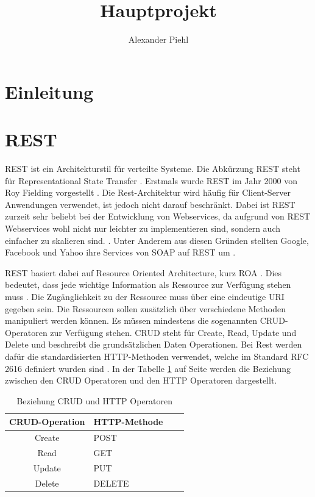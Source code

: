 \documentclass{llncs}
\title{Hauptprojekt}
\author{Alexander Piehl\\\email{alexander.piehl@haw-hamburg.de}
\institute{Hamburg University of Applied Sciences,\\Dept. Computer Science, \\ Berliner Tor 7\\ 20099 Hamburg, Germany\\}}
\begin{document}
\maketitle
\section{Einleitung}
\nocite{*}
\section{REST}
REST ist ein Architekturstil für verteilte Systeme. Die Abkürzung REST steht für Representational State Transfer \cite{chakrabarti2009test}.
Erstmals wurde REST im Jahr 2000 von Roy Fielding vorgestellt \citep{kao2013performance}.
Die Rest-Architektur wird häufig für Client-Server Anwendungen verwendet, ist jedoch nicht darauf beschränkt.
Dabei ist REST zurzeit sehr beliebt bei der Entwicklung von Webservices, da aufgrund von REST Webservices wohl nicht nur leichter zu implementieren sind, sondern auch einfacher zu skalieren sind. \cite{chakrabarti2009test}. 
Unter Anderem aus diesen Gründen stellten Google, Facebook und Yahoo ihre Services von SOAP auf REST um \cite{rodriguez2008restful, navas2014rest}.

REST basiert dabei auf Resource Oriented Architecture, kurz ROA \citep{chakrabarti2009test}. Dies bedeutet, dass jede wichtige Information als Ressource zur Verfügung stehen muss \cite{porres2011modeling}.
Die Zugänglichkeit zu der Ressource muss über eine eindeutige URI gegeben sein. Die Ressourcen sollen zusätzlich über verschiedene Methoden manipuliert werden können. Es müssen mindestens die sogenannten CRUD-Operatoren zur Verfügung stehen. CRUD steht für Create, Read, Update und Delete und beschreibt die grundsätzlichen Daten Operationen. Bei Rest werden dafür die standardisierten HTTP-Methoden verwendet, welche im Standard RFC 2616 definiert wurden sind \citep{kao2013performance}. In der Tabelle \ref{tab:CRUD_HTTP_Methods} auf Seite \pageref{tab:CRUD_HTTP_Methods} werden die Beziehung zwischen den CRUD Operatoren und den HTTP Operatoren dargestellt.

\begin{table}[htbp]
\centering
\begin{tabular}{|c|l|p{4cm}|p{4cm}|}
\hline
\multicolumn{1}{|l|}{CRUD-Operation} & HTTP-Methode \\ \hline
Create & POST  \\ \hline
Read & GET \\ \hline
Update & PUT \\ \hline
Delete & DELETE \\ \hline
\end{tabular}
\caption{Beziehung CRUD und HTTP Operatoren \cite{reza2010framework}}
\label{tab:CRUD_HTTP_Methods}
\end{table}
\end{document}

